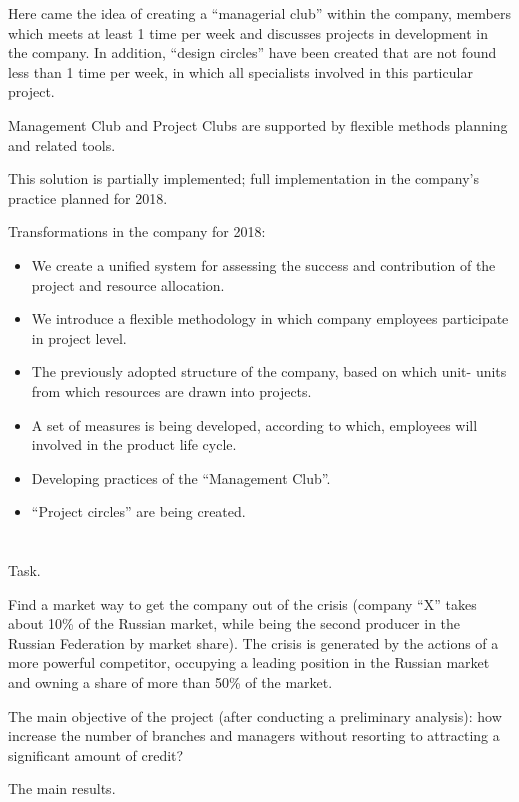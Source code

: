 \documentclass[11pt,a4paper]{book}
\begin{document}
Here came the idea of creating a “managerial club” within the company, members
which meets at least 1 time per week and discusses projects in development in
the company. In addition, “design circles” have been created that are not
found less than 1 time per week, in which all specialists involved in this
particular project.

Management Club and Project Clubs are supported by flexible methods planning
and related tools.

This solution is partially implemented; full implementation in the company's
practice planned for 2018.

Transformations in the company for 2018:
\begin{itemize}
\item We create a unified system for assessing the success and contribution of
  the project and resource allocation.
\item We introduce a flexible methodology in which company employees
  participate in project level.
\item The previously adopted structure of the company, based on which unit-
  units from which resources are drawn into projects.
\item A set of measures is being developed, according to which, employees will
  involved in the product life cycle.
\item Developing practices of the “Management Club”.
\item “Project circles” are being created.
\end{itemize}

\chapter{}%

Task.

Find a market way to get the company out of the crisis (company “X” takes
about 10\% of the Russian market, while being the second producer in the
Russian Federation by market share).  The crisis is generated by the actions
of a more powerful competitor, occupying a leading position in the Russian
market and owning a share of more than 50\% of the market.

The main objective of the project (after conducting a preliminary analysis):
how increase the number of branches and managers without resorting to
attracting a significant amount of credit?

The main results.
\end{document}
